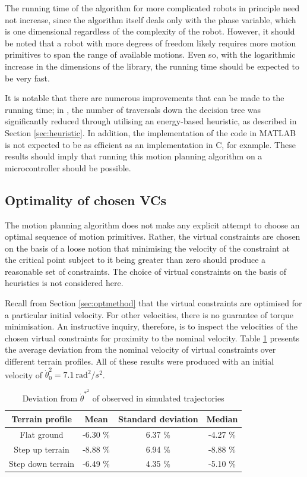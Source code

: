 The running time of the algorithm for more complicated robots in principle need not increase, since the algorithm itself deals only with the phase variable, which is one dimensional regardless of the complexity of the robot. However, it should be noted that a robot with more degrees of freedom likely requires more motion primitives to span the range of available motions. Even so, with the logarithmic increase in the dimensions of the library, the running time should be expected to be very fast.

It is notable that there are numerous improvements that can be made to the running time; in \cite{manchester13planning}, the number of traversals down the decision tree was significantly reduced through utilising an energy-based heuristic, as described in Section \ref{sec:heuristic}. In addition, the implementation of the code in MATLAB is not expected to be as efficient as an implementation in C, for example. These results should imply that running this motion planning algorithm on a microcontroller should be possible.

\subsection{Optimality of chosen VCs} \label{sec:resnom}
The motion planning algorithm does not make any explicit attempt to choose an optimal sequence of motion primitives. Rather, the virtual constraints are chosen on the basis of a loose notion that minimising the velocity of the constraint at the critical point subject to it being greater than zero should produce a reasonable set of constraints. The choice of virtual constraints on the basis of heuristics is not considered here.

Recall from Section \ref{sec:optmethod} that the virtual constraints are optimised for a particular initial velocity. For other velocities, there is no guarantee of torque minimisation. An instructive inquiry, therefore, is to inspect the velocities of the chosen virtual constraints for proximity to the nominal velocity. Table \ref{tab:nomvel} presents the average deviation from the nominal velocity of virtual constraints over different terrain profiles. All of these results were produced with an initial velocity of $\dot{\theta}_0^2=7.1~\mathrm{rad}^2/s^2$.

\begin{table}
	\centering
	\begin{tabular}{c | c | c | c }
		Terrain profile & Mean & Standard deviation & Median \\ \hline
		Flat ground & -6.30 \% & 6.37 \% & -4.27 \% \\
		Step up terrain & -8.88 \% & 6.94 \% & -8.88 \% \\
		Step down terrain & -6.49 \% & 4.35 \% & -5.10 \%\\
	\end{tabular}
	\caption{Deviation from $\dot{\theta}^{*^2}$ of observed in simulated trajectories}
	\label{tab:nomvel}
\end{table}

